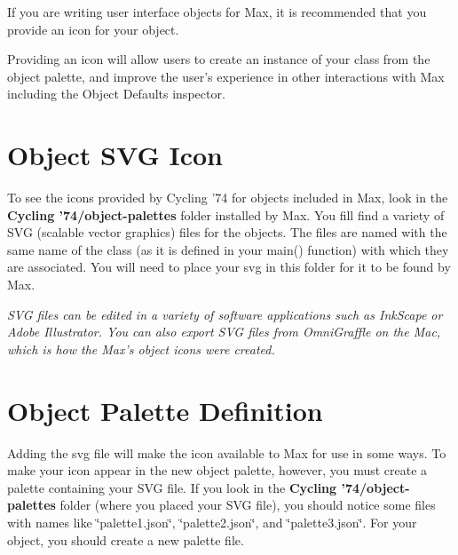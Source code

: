 If you are writing user interface objects for Max, it is recommended that you provide an icon for your object.

Providing an icon will allow users to create an instance of your class from the object palette, and improve the user's experience in other interactions with Max including the Object Defaults inspector.\hypertarget{chapter_appendix_b_appendix_b_svg}{}\section{Object SVG Icon}\label{chapter_appendix_b_appendix_b_svg}
To see the icons provided by Cycling '74 for objects included in Max, look in the {\bfseries Cycling '74/object-\/palettes} folder installed by Max. You fill find a variety of SVG (scalable vector graphics) files for the objects. The files are named with the same name of the class (as it is defined in your {\ttfamily main()} function) with which they are associated. You will need to place your svg in this folder for it to be found by Max.

{\itshape  SVG files can be edited in a variety of software applications such as InkScape or Adobe Illustrator. You can also export SVG files from OmniGraffle on the Mac, which is how the Max's object icons were created. \/}\hypertarget{chapter_appendix_b_appendix_b_icon}{}\section{Object Palette Definition}\label{chapter_appendix_b_appendix_b_icon}
Adding the svg file will make the icon available to Max for use in some ways. To make your icon appear in the new object palette, however, you must create a palette containing your SVG file. If you look in the {\bfseries Cycling '74/object-\/palettes} folder (where you placed your SVG file), you should notice some files with names like \char`\"{}palette1.json\char`\"{}, \char`\"{}palette2.json\char`\"{}, and \char`\"{}palette3.json\char`\"{}. For your object, you should create a new palette file.

